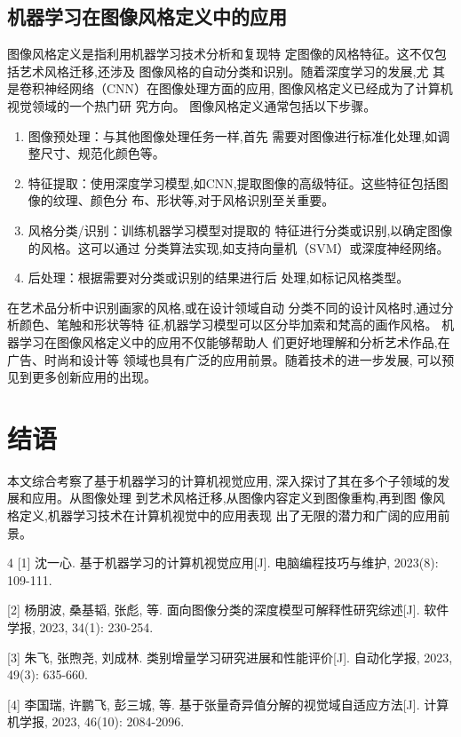 \documentclass[a4paper]{article}
\newcommand{\sectionbreak}{\clearpage} %
\theoremstyle{definition}
\theoremstyle{plain}
\theoremstyle{remark}
\begin{document}
\subsection{机器学习在图像风格定义中的应用}
图像风格定义是指利用机器学习技术分析和复现特
定图像的风格特征。这不仅包括艺术风格迁移,还涉及
图像风格的自动分类和识别。随着深度学习的发展,尤
其是卷积神经网络（CNN）在图像处理方面的应用,
图像风格定义已经成为了计算机视觉领域的一个热门研
究方向。
图像风格定义通常包括以下步骤。
\begin{enumerate}
	\item 图像预处理：与其他图像处理任务一样,首先
	需要对图像进行标准化处理,如调整尺寸、规范化颜色等。
	\item 特征提取：使用深度学习模型,如CNN,提取图像的高级特征。这些特征包括图像的纹理、颜色分
	布、形状等,对于风格识别至关重要。
	\item 风格分类/识别：训练机器学习模型对提取的
	特征进行分类或识别,以确定图像的风格。这可以通过
	分类算法实现,如支持向量机（SVM）或深度神经网络。
	\item 后处理：根据需要对分类或识别的结果进行后
	处理,如标记风格类型。
	\end{enumerate}
\hspace{2em}在艺术品分析中识别画家的风格,或在设计领域自动
分类不同的设计风格时,通过分析颜色、笔触和形状等特
征,机器学习模型可以区分毕加索和梵高的画作风格。
机器学习在图像风格定义中的应用不仅能够帮助人
们更好地理解和分析艺术作品,在广告、时尚和设计等
领域也具有广泛的应用前景。随着技术的进一步发展,
可以预见到更多创新应用的出现。
\sectionbreak

\section{结语}
本文综合考察了基于机器学习的计算机视觉应用,
深入探讨了其在多个子领域的发展和应用。从图像处理
到艺术风格迁移,从图像内容定义到图像重构,再到图
像风格定义,机器学习技术在计算机视觉中的应用表现
出了无限的潜力和广阔的应用前景。
\sectionbreak


\begin{thebibliography}{4}
	[1] 沈一心. 基于机器学习的计算机视觉应用[J]. 电脑编程技巧与维护, 2023(8): 109-111.\newline

	[2] 杨朋波, 桑基韬, 张彪, 等. 面向图像分类的深度模型可解释性研究综述[J]. 软件学报, 2023, 34(1): 230-254.\newline

	[3] 朱飞, 张煦尧, 刘成林. 类别增量学习研究进展和性能评价[J]. 自动化学报, 2023, 49(3): 635-660.\newline

	[4] 李国瑞, 许鹏飞, 彭三城, 等. 基于张量奇异值分解的视觉域自适应方法[J]. 计算机学报, 2023, 46(10): 2084-2096.

\end{thebibliography}
\clearpage
\appendix
{}
{}
\end{document}
